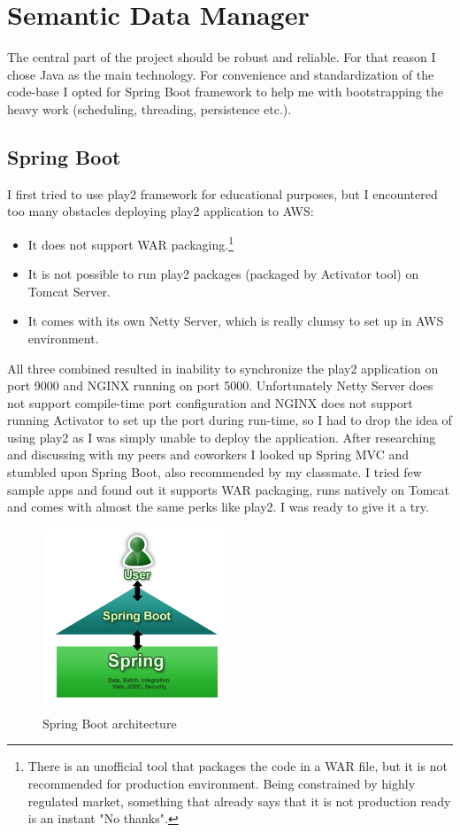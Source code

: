 \section{Semantic Data Manager}
The central part of the project should be robust and reliable. For that reason I chose Java as the main technology. For convenience and standardization of the code-base I opted for Spring Boot framework to help me with bootstrapping the heavy work (scheduling, threading, persistence etc.).

\subsection{Spring Boot}

I first tried to use play2 framework for educational purposes, but I encountered too many obstacles deploying play2 application to AWS: 

\begin{itemize}
	\item It does not support WAR packaging.\footnote{There is an unofficial tool that packages the code in a WAR file, but it is not recommended for production environment. Being constrained by highly regulated market, something that already says that it is not production ready is an instant "No thanks".}
	\item It is not possible to run play2 packages (packaged by Activator tool) on Tomcat Server.
	\item It comes with its own Netty Server, which is really clumsy to set up in AWS environment.
\end{itemize}

All three combined resulted in inability to synchronize the play2 application on port 9000 and NGINX running on port 5000. Unfortunately Netty Server does not support compile-time port configuration and NGINX does not support running Activator to set up the port during run-time, so I had to drop the idea of using play2 as I was simply unable to deploy the application. After researching and discussing with my peers and coworkers I looked up Spring MVC and stumbled upon Spring Boot, also recommended by my classmate. I tried few sample apps and found out it supports WAR packaging, runs natively on Tomcat and comes with almost the same perks like play2. I was ready to give it a try.

\begin{figure}[!ht]
	\centering
	\includegraphics[width=0.5\textwidth]{figures/spring}
    \caption{Spring Boot architecture}
\end{figure}

